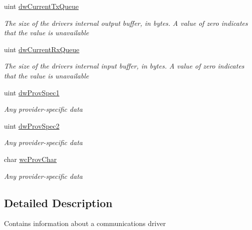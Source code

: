 \begin{DoxyCompactItemize}
uint \mbox{\hyperlink{struct_r_j_c_p_1_1_i_o_1_1_ports_1_1_native_1_1_windows_1_1_native_methods_1_1_comm_prop_af6c4aea9de72caaf761545809d9a8f6f}{dw\+Current\+Tx\+Queue}}
\begin{DoxyCompactList}\small\item\em The size of the driver\textquotesingle{}s internal output buffer, in bytes. A value of zero indicates that the value is unavailable \end{DoxyCompactList}\item 
uint \mbox{\hyperlink{struct_r_j_c_p_1_1_i_o_1_1_ports_1_1_native_1_1_windows_1_1_native_methods_1_1_comm_prop_a10e84563613b137b9ad63929cad68dd3}{dw\+Current\+Rx\+Queue}}
\begin{DoxyCompactList}\small\item\em The size of the driver\textquotesingle{}s internal input buffer, in bytes. A value of zero indicates that the value is unavailable \end{DoxyCompactList}\item 
uint \mbox{\hyperlink{struct_r_j_c_p_1_1_i_o_1_1_ports_1_1_native_1_1_windows_1_1_native_methods_1_1_comm_prop_ad0b639080531b9afa3dd25263d20dbae}{dw\+Prov\+Spec1}}
\begin{DoxyCompactList}\small\item\em Any provider-\/specific data \end{DoxyCompactList}\item 
uint \mbox{\hyperlink{struct_r_j_c_p_1_1_i_o_1_1_ports_1_1_native_1_1_windows_1_1_native_methods_1_1_comm_prop_a80b5079799210f84eeb42bcb04fec314}{dw\+Prov\+Spec2}}
\begin{DoxyCompactList}\small\item\em Any provider-\/specific data \end{DoxyCompactList}\item 
char \mbox{\hyperlink{struct_r_j_c_p_1_1_i_o_1_1_ports_1_1_native_1_1_windows_1_1_native_methods_1_1_comm_prop_a0815a4dea68f1ee0650187a9ca32f3f1}{wc\+Prov\+Char}}
\begin{DoxyCompactList}\small\item\em Any provider-\/specific data \end{DoxyCompactList}\end{DoxyCompactItemize}


\subsection{Detailed Description}
Contains information about a communications driver 



